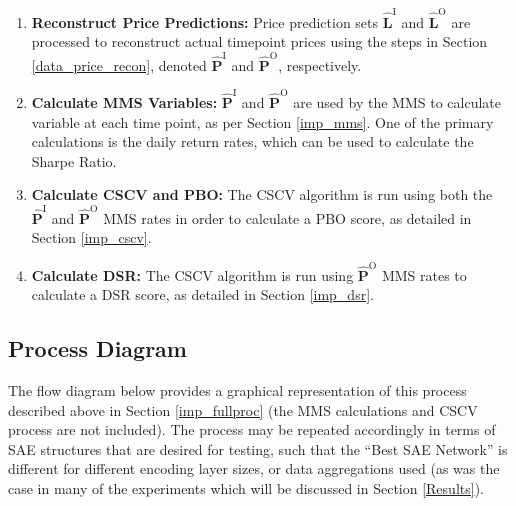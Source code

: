 \documentclass[a4paper,11pt,oneside]{article}
\theoremstyle{plain}
\theoremstyle{definition}
\begin{document}
\begin{enumerate}
		\item \textbf{Reconstruct Price Predictions:} Price prediction sets $\mathbf{\hat{L}}^\mathrm{I}$ and $\mathbf{\hat{L}}^\mathrm{O}$ are processed to reconstruct actual timepoint prices using the steps in Section \ref{data_price_recon}, denoted $\mathbf{\hat{P}}^\mathrm{I}$ and $\mathbf{\hat{P}}^\mathrm{O}$, respectively.
		\item \textbf{Calculate MMS Variables:} $\mathbf{\hat{P}}^\mathrm{I}$ and $\mathbf{\hat{P}}^\mathrm{O}$ are used by the MMS to calculate variable at each time point, as per Section \ref{imp_mms}. One of the primary calculations is the daily return rates, which can be used to calculate the Sharpe Ratio.
		\item \textbf{Calculate CSCV and PBO:} The CSCV algorithm is run using both the $\mathbf{\hat{P}}^\mathrm{I}$ and $\mathbf{\hat{P}}^\mathrm{O}$ MMS rates in order to calculate a PBO score, as detailed in Section \ref{imp_cscv}.
		\item \textbf{Calculate DSR:} The CSCV algorithm is run using $\mathbf{\hat{P}}^\mathrm{O}$ MMS rates to calculate a DSR score, as detailed in Section \ref{imp_dsr}.
	\end{enumerate}
	
	
	\subsection{Process Diagram}\label{proc_diagram}
	
	The flow diagram below provides a graphical representation of this process described above in Section \ref{imp_fullproc} (the MMS calculations and CSCV process are not included). The process may be repeated accordingly in terms of SAE structures that are desired for testing, such that the ``Best SAE Network'' is different for different encoding layer sizes, or data aggregations used (as was the case in many of the experiments which will be discussed in Section \ref{Results}).
	
\end{document}
